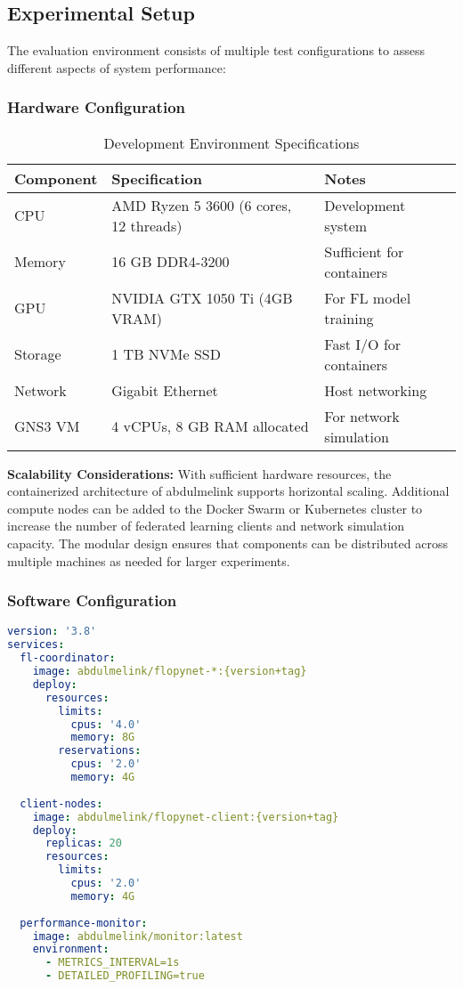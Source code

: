 \subsection{Experimental Setup}

The evaluation environment consists of multiple test configurations to assess different aspects of system performance:

\subsubsection{Hardware Configuration}
\begin{table}[htbp]
\centering
\caption{Development Environment Specifications}
\label{tab:test-environment}
\begin{tabular}{|l|l|l|}
\hline
\textbf{Component} & \textbf{Specification} & \textbf{Notes} \\
\hline
CPU & AMD Ryzen 5 3600 (6 cores, 12 threads) & Development system \\
\hline
Memory & 16 GB DDR4-3200 & Sufficient for containers \\
\hline
GPU & NVIDIA GTX 1050 Ti (4GB VRAM) & For FL model training \\
\hline
Storage & 1 TB NVMe SSD & Fast I/O for containers \\
\hline
Network & Gigabit Ethernet & Host networking \\
\hline
GNS3 VM & 4 vCPUs, 8 GB RAM allocated & For network simulation \\
\hline
\end{tabular}
\end{table}

\textbf{Scalability Considerations:} With sufficient hardware resources, the containerized architecture of abdulmelink supports horizontal scaling. Additional compute nodes can be added to the Docker Swarm or Kubernetes cluster to increase the number of federated learning clients and network simulation capacity. The modular design ensures that components can be distributed across multiple machines as needed for larger experiments.

\subsubsection{Software Configuration}
\begin{lstlisting}[language=yaml, caption=Docker Compose Test Configuration]
version: '3.8'
services:
  fl-coordinator:
    image: abdulmelink/flopynet-*:{version+tag}
    deploy:
      resources:
        limits:
          cpus: '4.0'
          memory: 8G
        reservations:
          cpus: '2.0'
          memory: 4G
          
  client-nodes:
    image: abdulmelink/flopynet-client:{version+tag}
    deploy:
      replicas: 20
      resources:
        limits:
          cpus: '2.0'
          memory: 4G
          
  performance-monitor:
    image: abdulmelink/monitor:latest
    environment:
      - METRICS_INTERVAL=1s
      - DETAILED_PROFILING=true
\end{lstlisting}

